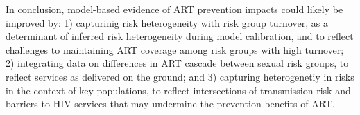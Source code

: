 \par
In conclusion, model-based evidence of ART prevention impacts could likely be improved by:
1) capturinig risk heterogeneity with risk group turnover,
   as a determinant of inferred risk heterogeneity during model calibration, and
   to reflect challenges to maintaining ART coverage among risk groups with high turnover;
2) integrating data on differences in ART cascade between sexual risk groups,
   to reflect services as delivered on the ground; and
3) capturing heterogenetiy in risks in the context of key populations,
   to reflect intersections of transmission risk and barriers to HIV services
   that may undermine the prevention benefits of ART.
